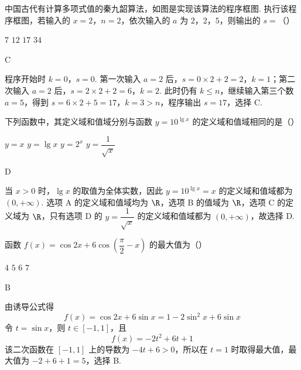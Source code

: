 \begin{problem}
中国古代有计算多项式值的秦九韶算法，如图是实现该算法的程序框图. 执行该程序框图，若输入的 \(x=2\)，\(n=2\)，依次输入的 \(a\) 为 \(2\)，\(2\)，\(5\)，则输出的 \(s=\)（\quad）

\begingroup
{}
\endgroup

\choices
    {\(7\)}
    {\(12\)}
    {\(17\)}
    {\(34\)}
\end{problem}

\begin{answer}
C
\end{answer}

\begin{solution}
程序开始时 \(k=0\)，\(s=0\). 第一次输入 \(a=2\) 后，\(s=0\times2+2=2\)，\(k=1\)；第二次输入 \(a=2\) 后，\(s=2\times2+2=6\)，\(k=2\). 此时仍有 \(k\leq n\)，继续输入第三个数 \(a=5\)，得到 \(s=6\times2+5=17\)，\(k=3>n\)，程序输出 \(s=17\)，选择 C.
\end{solution}


\begin{problem}
下列函数中，其定义域和值域分别与函数 \(y=10^{\lg x}\) 的定义域和值域相同的是（\quad）

\choices
    {\(y=x\)}
    {\(y=\lg x\)}
    {\(y=2^x\)}
    {\(y=\dfrac{1}{\sqrt{x}}\)}
\end{problem}

\begin{answer}
D
\end{answer}

\begin{solution}
当 \(x>0\) 时，\(\lg x\) 的取值为全体实数，因此 \(y=10^{\lg x}=x\) 的定义域和值域都为 \((0,+\infty)\). 选项 A 的定义域和值域均为 \(\R\)，选项 B 的值域为 \(\R\)，选项 C 的定义域为 \(\R\)，只有选项 D 的 \(y=\dfrac1{\sqrt{x}}\) 的定义域和值域都为 \((0,+\infty)\)，故选择 D.
\end{solution}


\begin{problem}
函数 \(f(x)=\cos2x+6\cos\left(\dfrac{\pi}{2}-x\right)\) 的最大值为（\quad）

\choices
    {\(4\)}
    {\(5\)}
    {\(6\)}
    {\(7\)}
\end{problem}

\begin{answer}
B
\end{answer}

\begin{solution}
由诱导公式得
\[
f(x)=\cos2x+6\sin x=1-2\sin^2x+6\sin x
\]
令 \(t=\sin x\)，则 \(t\in[-1,1]\)，且
\[
f(x)=-2t^2+6t+1
\]
该二次函数在 \([-1,1]\) 上的导数为 \(-4t+6>0\)，所以在 \(t=1\) 时取得最大值，最大值为 \(-2+6+1=5\)，选择 B.
\end{solution}


